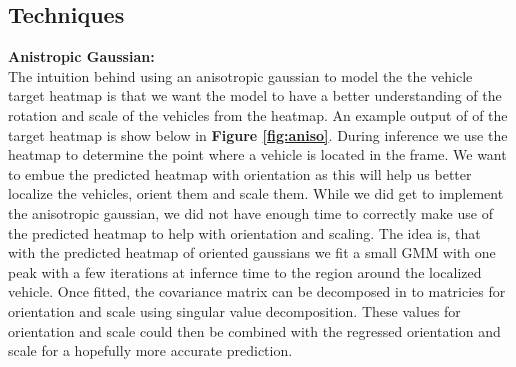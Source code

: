 \documentclass[letter]{article}
\newcommand{\fref}[1]{\textbf{Figure \ref{#1}}}
\begin{document}
	\subsection{Techniques}
	\textbf{Anistropic Gaussian:}\\
    The intuition behind using an anisotropic gaussian to model the the vehicle target heatmap is that we want the model to have a better understanding of the rotation and scale of the vehicles from the heatmap. An example output of of the target heatmap is show below in \fref{fig:aniso}. During inference we use the heatmap to determine the point where a vehicle is located in the frame. We want to embue the predicted heatmap with orientation as this will help us better localize the vehicles, orient them and scale them. While we did get to implement the anisotropic gaussian, we did not have enough time to correctly make use of the predicted heatmap to help with orientation and scaling. The idea is, that with the predicted heatmap of oriented gaussians we fit a small GMM with one peak with a few iterations at infernce time to the region around the localized vehicle. Once fitted, the covariance matrix can be decomposed in to matricies for orientation and scale using singular value decomposition. These values for orientation and scale could then be combined with the regressed orientation and scale for a hopefully more accurate prediction.
\end{document}
